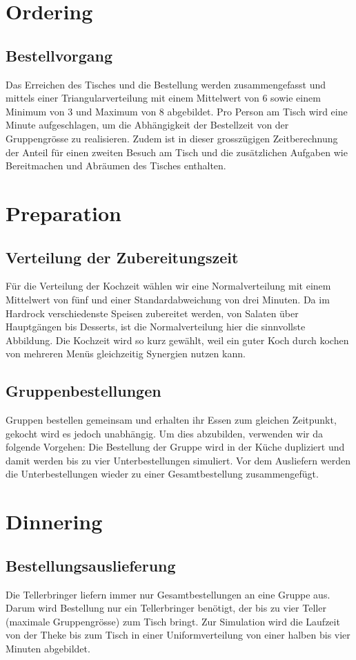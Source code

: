 \documentclass[ngerman,a4paper,12pt]{scrreprt}
\begin{document}
	
	\section{Ordering}			
		\subsection{Bestellvorgang}
			Das Erreichen des Tisches und die Bestellung werden zusammengefasst und mittels einer Triangularverteilung mit einem Mittelwert von 6 sowie einem Minimum von 3 und Maximum von 8 abgebildet. Pro Person am Tisch wird eine Minute aufgeschlagen, um die Abhängigkeit der Bestellzeit von der Gruppengrösse zu realisieren. Zudem ist in dieser grosszügigen Zeitberechnung der Anteil für einen zweiten Besuch am Tisch und die zusätzlichen Aufgaben wie Bereitmachen und Abräumen des Tisches enthalten.
	
	
	\section{Preparation}	
		\subsection{Verteilung der Zubereitungszeit}
			Für die Verteilung der Kochzeit wählen wir eine Normalverteilung mit einem Mittelwert von fünf und einer Standardabweichung von drei Minuten. Da im Hardrock verschiedenste Speisen zubereitet werden, von Salaten über Hauptgängen bis Desserts, ist die Normalverteilung hier die sinnvollste Abbildung. Die Kochzeit wird so kurz gewählt, weil ein guter Koch durch kochen von mehreren Menüs gleichzeitig Synergien nutzen kann.
	
	
		\subsection{Gruppenbestellungen}
			Gruppen bestellen gemeinsam und erhalten ihr Essen zum gleichen Zeitpunkt, gekocht wird es jedoch unabhängig. Um dies abzubilden, verwenden wir da folgende Vorgehen: Die Bestellung der Gruppe wird in der Küche dupliziert und damit werden bis zu vier Unterbestellungen simuliert. Vor dem Ausliefern werden die Unterbestellungen wieder zu einer Gesamtbestellung zusammengefügt.
			
			
	\section{Dinnering}
		\subsection{Bestellungsauslieferung}					
			Die Tellerbringer liefern immer nur Gesamtbestellungen an eine Gruppe aus. Darum wird Bestellung nur ein Tellerbringer benötigt, der bis zu vier Teller (maximale Gruppengrösse) zum Tisch bringt. Zur Simulation wird die Laufzeit von der Theke bis zum Tisch in einer Uniformverteilung von einer halben bis vier Minuten abgebildet.
\end{document}
